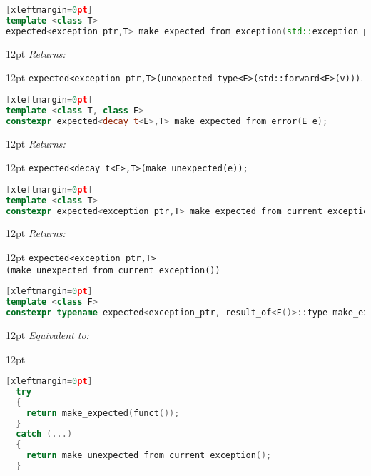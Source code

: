 \documentclass[a4paper,10pt]{article}
\newcommand{\cpp}[1]{\lstinline{#1}}
\newcommand{\wordingItem}[1]{\noindent\textit{#1:}}
\newenvironment{wordingTextItem}[1]{\wordingItem{#1}\vspace{2pt}\noindent\begin{adjustwidth}{12pt}{}}{\vspace{2pt}\end{adjustwidth}}
\newenvironment{wordingPara}{\begin{adjustwidth}{12pt}{}}{\end{adjustwidth}}
\begin{document}
\begin{lstlisting}[language=C++][xleftmargin=0pt]
template <class T>
expected<exception_ptr,T> make_expected_from_exception(std::exception_ptr v); 
\end{lstlisting}
\begin{wordingPara}
\begin{wordingTextItem}{Returns}
\cpp{expected<exception_ptr,T>(unexpected_type<E>(std::forward<E>(v)))}.
\end{wordingTextItem}
\end{wordingPara}

\begin{lstlisting}[language=C++][xleftmargin=0pt]
template <class T, class E>
constexpr expected<decay_t<E>,T> make_expected_from_error(E e);
\end{lstlisting}
\begin{wordingPara}
\begin{wordingTextItem}{Returns}
\cpp{expected<decay_t<E>,T>(make_unexpected(e));}
\end{wordingTextItem}
\end{wordingPara}


\begin{lstlisting}[language=C++][xleftmargin=0pt]
template <class T>
constexpr expected<exception_ptr,T> make_expected_from_current_exception(); 
\end{lstlisting}
\begin{wordingPara}
\begin{wordingTextItem}{Returns}
\cpp{expected<exception_ptr,T>(make_unexpected_from_current_exception())}
\end{wordingTextItem}
\end{wordingPara}

\begin{lstlisting}[language=C++][xleftmargin=0pt]
template <class F>
constexpr typename expected<exception_ptr, result_of<F()>::type make_expected_from_call(F funct);
\end{lstlisting}
\begin{wordingPara}
\begin{wordingTextItem}{Equivalent to}
\begin{lstlisting}[language=C++][xleftmargin=0pt]
  try
  {
    return make_expected(funct());
  }
  catch (...)
  {
    return make_unexpected_from_current_exception();
  }
\end{lstlisting}
\end{wordingTextItem}
\end{wordingPara}
\end{document}

